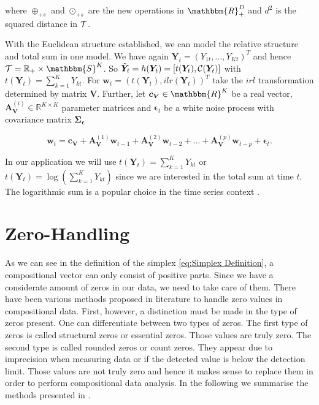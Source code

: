 where $\oplus_{+s}$ and $\odot_{+s}$ are the new operations in $\mathbbm{R}_+^D$ and $d^2$ is the squared distance in $\mathcal{T}$. 

With the Euclidean structure established, we can model the relative structure and total sum in one model.  We have again $\bm{Y}_t=(Y_{1t},\ldots,Y_{Kt})^T$ and hence $\Tsp = \mathbb{R}_+ \times \mathbbm{S}^K$. So $\tilde{\bm{Y}}_t=h(\bm{Y}_t)=[t(\bm{Y}_t),\mathcal{C}(\bm{Y}_t)]$ with $t(\bm{Y}_t)=\sum_{k=1}^K Y_{kt}$. For $\bm{w}_t =(t(\bm{Y}_t),ilr(\bm{Y}_t))^T$ take the $irl$ transformation determined by matrix $\bm{V}$. Further, let $\bm{c}_{\bm{V}} \in \mathbbm{R}^K$ be a real vector, $\textbf{A}_{\textbf{V}}^{(i)} \in \mathbb{R}^{K \times K}$ parameter matrices and $\bm{\epsilon}_t$ be a white noise process with covariance matrix $\bm{\Sigma_\epsilon}$

\begin{equation}
\textbf{w}_t = \textbf{c}_{\textbf{V}} + \textbf{A}_{\textbf{V}}^{(1)}\textbf{w}_{t-1} + \textbf{A}_{\textbf{V}}^{(2)}\textbf{w}_{t-2} + \ldots + \textbf{A}_{\textbf{V}}^{(p)}\textbf{w}_{t-p} + \bm{\epsilon}_{t}.
\label{eq:VAR model Tspace}
\end{equation}

In our application we will use $t(\bm{Y}_t)=\sum_{k=1}^K Y_{kt}$ or $t(\bm{Y}_t)=\log(\sum_{k=1}^K Y_{kt})$ since we are interested in the total sum at time $t$. The logarithmic sum is a popular choice in the time series context \cite{Kynclova:2015}. 

\section{Zero-Handling}
\label{sec: Zero-Handling}

As we can see in the definition of the simplex \ref{eq:Simplex Definition}, a compositional vector can only consist of positive parts. Since we have a considerate amount of zeros in our data, we need to take care of them. There have been various methods proposed in literature to handle zero values in compositional data. First, however, a distinction must be made in the type of zeros present. One can differentiate between two types of zeros. The first type of zeros is called structural zeros or essential zeros. Those values are truly zero. The second type is called rounded zeros or count zeros. They appear due to imprecision when measuring data or if the detected value is below the detection limit. Those values are not truly zero and hence it makes sense to replace them in order to perform compositional data analysis. In the following we summarise the methods presented in \cite{Lubbe:2021,Josep:2003}. 


